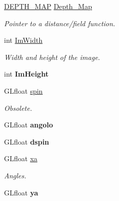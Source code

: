 \begin{DoxyCompactItemize}
\item 
\hypertarget{classDraw_a840dda96dc55e47741fc47e2a7c80526}{\hyperlink{classDraw_af1513ca0f3e04442fc69e97a85ade56e}{\-D\-E\-P\-T\-H\-\_\-\-M\-A\-P} \hyperlink{classDraw_a840dda96dc55e47741fc47e2a7c80526}{\-Depth\-\_\-\-Map}}\label{classDraw_a840dda96dc55e47741fc47e2a7c80526}

\begin{DoxyCompactList}\small\item\em \-Pointer to a distance/field function. \end{DoxyCompactList}\item 
\hypertarget{classDraw_ab92a87c2480115eaf15a27a8fa0cd965}{int \hyperlink{classDraw_ab92a87c2480115eaf15a27a8fa0cd965}{\-Im\-Width}}\label{classDraw_ab92a87c2480115eaf15a27a8fa0cd965}

\begin{DoxyCompactList}\small\item\em \-Width and height of the image. \end{DoxyCompactList}\item 
\hypertarget{classDraw_abd2f71d308d9b0a27e2c047fc7af3aa4}{int {\bfseries \-Im\-Height}}\label{classDraw_abd2f71d308d9b0a27e2c047fc7af3aa4}

\item 
\hypertarget{classDraw_a31a0a56b0946f085f98ad55b0d06d072}{\-G\-Lfloat \hyperlink{classDraw_a31a0a56b0946f085f98ad55b0d06d072}{spin}}\label{classDraw_a31a0a56b0946f085f98ad55b0d06d072}

\begin{DoxyCompactList}\small\item\em \-Obsolete. \end{DoxyCompactList}\item 
\hypertarget{classDraw_af8bb07b668883a1aeaad90da7202c8ef}{\-G\-Lfloat {\bfseries angolo}}\label{classDraw_af8bb07b668883a1aeaad90da7202c8ef}

\item 
\hypertarget{classDraw_a4a17821d6cf2e874a3a7c8a00be88b9e}{\-G\-Lfloat {\bfseries dspin}}\label{classDraw_a4a17821d6cf2e874a3a7c8a00be88b9e}

\item 
\hypertarget{classDraw_aee18a4afd2986ed1f3be1939903b9539}{\-G\-Lfloat \hyperlink{classDraw_aee18a4afd2986ed1f3be1939903b9539}{xa}}\label{classDraw_aee18a4afd2986ed1f3be1939903b9539}

\begin{DoxyCompactList}\small\item\em \-Angles. \end{DoxyCompactList}\item 
\hypertarget{classDraw_a7a543ac8488e183173150a9da70b611e}{\-G\-Lfloat {\bfseries ya}}\label{classDraw_a7a543ac8488e183173150a9da70b611e}


\end{DoxyCompactItemize}
